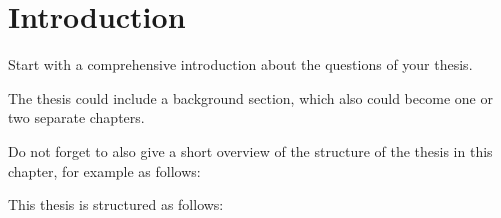 
\chapter{Introduction}\label{Introduction}

Start with a comprehensive introduction about the questions of your thesis.

The thesis could include a background section, which also could become one or two separate chapters.

Do not forget to also give a short overview of the structure of the thesis in this chapter, for example as follows:

\medskip
This thesis is structured as follows:
